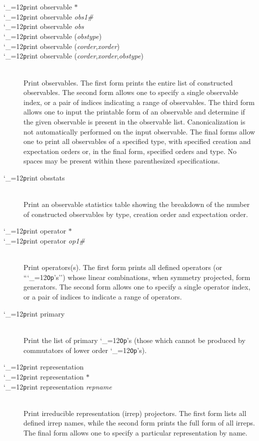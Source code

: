 \documentclass [12pt]{article}
\makeatletter
\renewcommand{\tt}{\begingroup\catcode`_=12\def\_{\string_}\tt@}
\newcommand{\tt@}[1]{\texttt{#1}\endgroup}
\makeatother
\begin{document}
\begin{description}
\item [\tt print observable $*$] \bgroup \itemsep 0pt \parskip 0pt
\item [\tt print observable {\it obs1\#} {\tt{[}}{\it obs2\#}{\tt{]}}]
\item [\tt print observable {\it obs}]
\item [\tt print observable ({\it obstype})]
\item [\tt print observable ({\it corder},{\it xorder})]
\item [\tt print observable ({\it corder},{\it xorder},{\it obstype})]~\\
    Print observables.
    The first form prints the entire list of constructed observables.
    The second form allows one to 
    specify a single observable index, or a pair
    of indices indicating a range of observables.
    The third form allows one to input the printable form of an observable
    and determine if the given observable is present in the observable list.
    Canonicalization is not automatically performed on the input observable.
    The final forms allow one to print all observables of a specified type,
    with specified creation and expectation orders or, in the final form,
    specified orders and type.
    No spaces may be present within these parenthesized specifications.
\egroup

\item [\tt print obsstats]~\\
    Print an observable statistics table showing the breakdown of the
    number of constructed observables by type, creation order
    and expectation order.

\item [\tt print operator $*$] \bgroup \itemsep 0pt \parskip 0pt
\item [\tt print operator {\it op1\#} {\tt{[}}{\it op2\#}{\tt{]}}]~\\
    Print operators(s).
    The first form prints all defined operators (or ``\tt{Op}'s'')
    whose linear combinations, when symmetry projected, form generators.
    The second form allows one to 
    specify a single operator index, or a pair
    of indices to indicate a range of operators.
\egroup

\item [\tt print primary]~\\
    Print the list of primary \tt{Op}'s (those which cannot be
    produced by commutators of lower order \tt{Op}'s).

\item [\tt print representation] \bgroup \itemsep 0pt \parskip 0pt
\item [\tt print representation $*$]
\item [\tt print representation {\it repname}]~\\
    Print irreducible representation (irrep) projectors.
    The first form lists all defined irrep names,
    while the second form prints the full form of all irreps.
    The final form allows one to specify a particular representation by name.
\egroup


\end{description}
\end{document}

